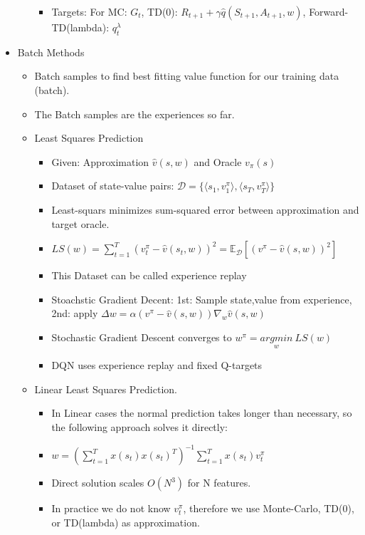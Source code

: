 \begin{itemize}[noitemsep,nolistsep]
\begin{itemize}
\begin{itemize}[noitemsep,nolistsep]
			\item Targets: For MC: $G_t$, TD(0): $R_{t+1} + \gamma\hat{q}(S_{t+1},A_{t+1},w)$, Forward-TD(lambda): $q_t^\lambda$
		\end{itemize}
	\end{itemize}
	\item Batch Methods
	\begin{itemize}[noitemsep,nolistsep]
		\item Batch samples to find best fitting value function for our training data (batch).
		\item The Batch samples are the experiences so far.
		\item Least Squares Prediction
		\begin{itemize}[noitemsep,nolistsep]
			\item Given: Approximation $\hat{v}(s,w)$ and Oracle $v_\pi(s)$
			\item Dataset of state-value pairs: $\mathcal{D} = \{\langle s_1,v_1^\pi\rangle, \langle s_T,v_T^\pi\rangle\}$
			\item Least-squars minimizes sum-squared error between approximation and target oracle.
			\item $LS(w) = \sum_{t=1}^T(v_t^\pi - \hat{v}(s_t,w))^2 = \mathbb{E}_\mathcal{D} [(v^\pi - \hat{v}(s,w))^2]$
			\item This Dataset can be called experience replay
			\item Stoachstic Gradient Decent: 1st: Sample state,value from experience, 2nd: apply $\Delta w = \alpha (v^\pi - \hat{v}(s,w))\nabla_w \hat{v}(s,w)$
			\item Stochastic Gradient Descent converges to $w^\pi = \underset{w}{argmin}\ LS(w)$
			\item DQN uses experience replay and fixed Q-targets
		\end{itemize}
		\item Linear Least Squares Prediction.
		\begin{itemize}[noitemsep,nolistsep]
			\item In Linear cases the normal prediction takes longer than necessary, so the following approach solves it directly:
			\item $w = (\sum_{t=1}^T x(s_t)x(s_t)^T)^{-1} \sum_{t=1}^T x(s_t)v_t^\pi$
			\item Direct solution scales $O(N^3)$ for N features.
			\item In practice we do not know $v_t^\pi$, therefore we use Monte-Carlo, TD(0), or TD(lambda) as approximation.
		\end{itemize}

\end{itemize}
\end{itemize}
